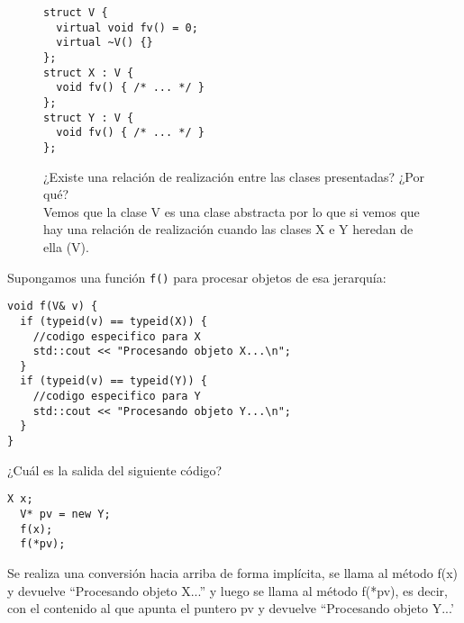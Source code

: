 \begin{enumerate}[label = \alph*)]
\begin{figure}[h]
  \begin{minipage}{0.38\textwidth}
    \begin{lstlisting}[frame = single]
struct V {
  virtual void fv() = 0;
  virtual ~V() {}
};
struct X : V {
  void fv() { /* ... */ }
};
struct Y : V {
  void fv() { /* ... */ }
};
      \end{lstlisting}    
  \end{minipage}
\hfill
  \begin{minipage}{0.55\textwidth}
    \vspace*{-2.5cm}
      \item ¿Existe una relación de realización entre las clases presentadas? ¿Por qué?\\
      
      Vemos que la clase V es una clase abstracta por lo que si vemos que hay una relación de realización cuando las clases X e Y heredan de ella (V).

  \end{minipage}
\end{figure}

  Supongamos una función \texttt{f()} para procesar objetos de esa jerarquía:
  \begin{center}
    \begin{lstlisting}[frame = single]
void f(V& v) {
  if (typeid(v) == typeid(X)) {
    //codigo especifico para X
    std::cout << "Procesando objeto X...\n"; 
  }
  if (typeid(v) == typeid(Y)) {
    //codigo especifico para Y
    std::cout << "Procesando objeto Y...\n"; 
  }
}
  \end{lstlisting}
\end{center}
  \newpage
  \item ¿Cuál es la salida del siguiente código?

    \begin{minipage}{0.25\textwidth}
      \begin{lstlisting}[frame = single]
  X x; 
  V* pv = new Y;
  f(x); 
  f(*pv);
      \end{lstlisting}
    \end{minipage}
  \hfill
    \begin{minipage}{0.6\textwidth}
    Se realiza una conversión hacia arriba de forma implícita, se llama al método f(x) y devuelve ``Procesando objeto X...'' y luego se llama al método f(*pv), es decir, con el contenido al que apunta el puntero pv y devuelve ``Procesando objeto Y...'
    \end{minipage}


\end{enumerate}
